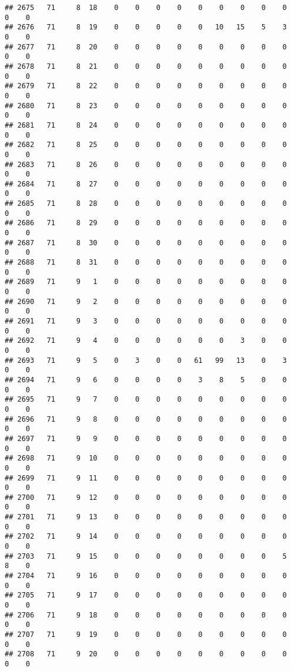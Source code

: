 \documentclass[]{article}
\begin{document}
\begin{verbatim}
## 2675   71     8  18    0    0    0    0    0    0    0    0    0    0    0
## 2676   71     8  19    0    0    0    0    0   10   15    5    3    0    0
## 2677   71     8  20    0    0    0    0    0    0    0    0    0    0    0
## 2678   71     8  21    0    0    0    0    0    0    0    0    0    0    0
## 2679   71     8  22    0    0    0    0    0    0    0    0    0    0    0
## 2680   71     8  23    0    0    0    0    0    0    0    0    0    0    0
## 2681   71     8  24    0    0    0    0    0    0    0    0    0    0    0
## 2682   71     8  25    0    0    0    0    0    0    0    0    0    0    0
## 2683   71     8  26    0    0    0    0    0    0    0    0    0    0    0
## 2684   71     8  27    0    0    0    0    0    0    0    0    0    0    0
## 2685   71     8  28    0    0    0    0    0    0    0    0    0    0    0
## 2686   71     8  29    0    0    0    0    0    0    0    0    0    0    0
## 2687   71     8  30    0    0    0    0    0    0    0    0    0    0    0
## 2688   71     8  31    0    0    0    0    0    0    0    0    0    0    0
## 2689   71     9   1    0    0    0    0    0    0    0    0    0    0    0
## 2690   71     9   2    0    0    0    0    0    0    0    0    0    0    0
## 2691   71     9   3    0    0    0    0    0    0    0    0    0    0    0
## 2692   71     9   4    0    0    0    0    0    0    3    0    0    0    0
## 2693   71     9   5    0    3    0    0   61   99   13    0    3    0    0
## 2694   71     9   6    0    0    0    0    3    8    5    0    0    0    0
## 2695   71     9   7    0    0    0    0    0    0    0    0    0    0    0
## 2696   71     9   8    0    0    0    0    0    0    0    0    0    0    0
## 2697   71     9   9    0    0    0    0    0    0    0    0    0    0    0
## 2698   71     9  10    0    0    0    0    0    0    0    0    0    0    0
## 2699   71     9  11    0    0    0    0    0    0    0    0    0    0    0
## 2700   71     9  12    0    0    0    0    0    0    0    0    0    0    0
## 2701   71     9  13    0    0    0    0    0    0    0    0    0    0    0
## 2702   71     9  14    0    0    0    0    0    0    0    0    0    0    0
## 2703   71     9  15    0    0    0    0    0    0    0    0    5    8    0
## 2704   71     9  16    0    0    0    0    0    0    0    0    0    0    0
## 2705   71     9  17    0    0    0    0    0    0    0    0    0    0    0
## 2706   71     9  18    0    0    0    0    0    0    0    0    0    0    0
## 2707   71     9  19    0    0    0    0    0    0    0    0    0    0    0
## 2708   71     9  20    0    0    0    0    0    0    0    0    0    0    0

\end{verbatim}
\end{document}
